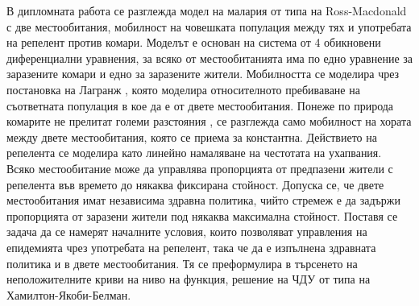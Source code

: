 В дипломната работа се разглежда модел на малария от типа на Ross-Macdonald с две местообитания, мобилност на човешката популация между тях и употребата на репелент против комари.
Моделът е основан на система от 4 обикновени диференциални уравнения, за всяко от местообитанията има по едно уравнение за заразените комари и едно за заразените жители.
Мобилността се моделира чрез постановка на Лагранж \cite{Cosner2009}, която моделира относителното пребиваване на съответната популация в кое да е от двете местообитания.
Понеже по природа комарите не прелитат големи разстояния \cite{Elbers2015, Bichara2016}, се разглежда само мобилност на хората между двете местообитания, която се приема за константна.
Действието на репелента се моделира като линейно намаляване на честотата на ухапвания.
Всяко местообитание може да управлява пропорцията от предпазени жители с репелента във времето до някаква фиксирана стойност.
Допуска се, че двете местообитания имат независима здравна политика, чийто стремеж е да задържи пропорцията от заразени жители под някаква максимална стойност.
Поставя се задача да се намерят началните условия, които позволяват управления на епидемията чрез употребата на репелент, така че да е изпълнена здравната политика и в двете местообитания.
Тя се преформулира в търсенето на неположителните криви на ниво на функция, решение на ЧДУ от типа на Хамилтон-Якоби-Белман.


